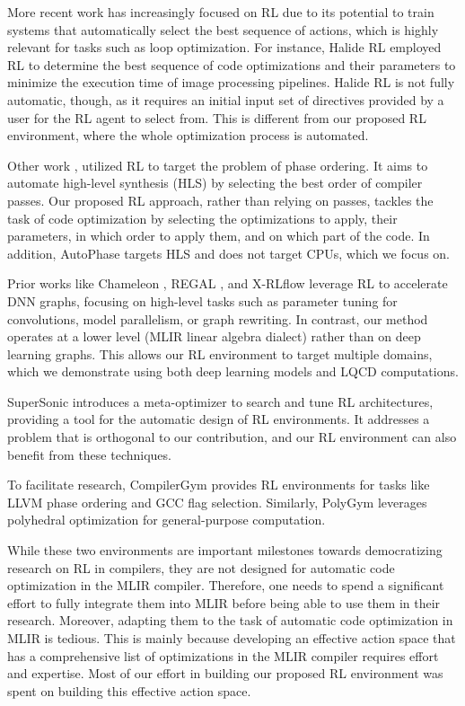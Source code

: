 \documentclass[10pt,twocolumn]{article}
\begin{document}
More recent work has increasingly focused on RL due to its potential to train systems that automatically select the best sequence of actions, which is highly relevant for tasks such as loop optimization. For instance, Halide RL \cite{ref6} employed RL to determine the best sequence of code optimizations and their parameters to minimize the execution time of image processing pipelines. Halide RL is not fully automatic, though, as it requires an initial input set of directives provided by a user for the RL agent to select from. This is different from our proposed RL environment, where the whole optimization process is automated.

Other work \cite{ref9}, \cite{ref10} utilized RL to target the problem of phase ordering. It aims to automate high-level synthesis (HLS) by selecting the best order of compiler passes. Our proposed RL approach, rather than relying on passes, tackles the task of code optimization by selecting the optimizations to apply, their parameters, in which order to apply them, and on which part of the code. In addition, AutoPhase \cite{ref10} targets HLS and does not target CPUs, which we focus on.

Prior works like Chameleon \cite{ref7}, REGAL \cite{ref47}, and X-RLflow \cite{ref48} leverage RL to accelerate DNN graphs, focusing on high-level tasks such as parameter tuning for convolutions, model parallelism, or graph rewriting. In contrast, our method operates at a lower level (MLIR linear algebra dialect) rather than on deep learning graphs. This allows our RL environment to target multiple domains, which we demonstrate using both deep learning models and LQCD computations.

SuperSonic \cite{ref11} introduces a meta-optimizer to search and tune RL architectures, providing a tool for the automatic design of RL environments. It addresses a problem that is orthogonal to our contribution, and our RL environment can also benefit from these techniques.

To facilitate research, CompilerGym \cite{ref13} provides RL environments for tasks like LLVM phase ordering and GCC flag selection. Similarly, PolyGym \cite{ref37} leverages polyhedral optimization for general-purpose computation.

While these two environments are important milestones towards democratizing research on RL in compilers, they are not designed for automatic code optimization in the MLIR compiler. Therefore, one needs to spend a significant effort to fully integrate them into MLIR before being able to use them in their research. Moreover, adapting them to the task of automatic code optimization in MLIR is tedious. This is mainly because developing an effective action space that has a comprehensive list of optimizations in the MLIR compiler requires effort and expertise. Most of our effort in building our proposed RL environment was spent on building this effective action space.
\end{document}
